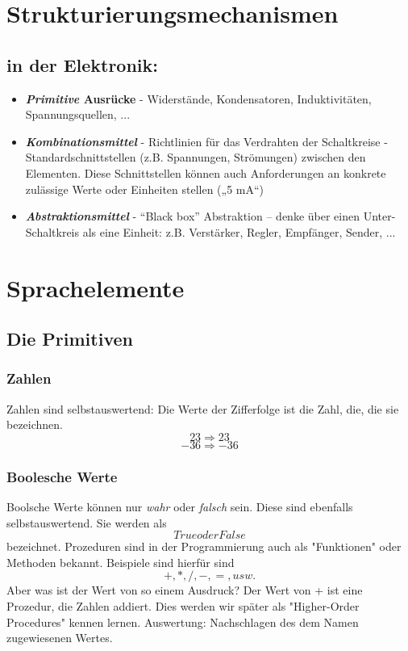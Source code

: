 \section{Strukturierungsmechanismen}
\subsection{in der Elektronik:}
\begin{itemize}
	\item \textbf{\textit{Primitive} Ausrücke}
		\subitem - Widerstände, Kondensatoren, Induktivitäten, Spannungsquellen, ...

	\item \textbf{\textit{Kombinationsmittel}}
		\subitem - Richtlinien für das Verdrahten der Schaltkreise
		\subitem - Standardschnittstellen (z.B. Spannungen, Strömungen) zwischen den
		Elementen. Diese Schnittstellen können auch Anforderungen an
		konkrete zulässige Werte oder Einheiten stellen („5 mA“)

	\item \textbf{\textit{Abstraktionsmittel}}
		\subitem - 	“Black box” Abstraktion – denke über einen Unter-Schaltkreis als eine
		Einheit: z.B. Verstärker, Regler, Empfänger, Sender, ...
\end{itemize}


\section{Sprachelemente}

\subsection{Die Primitiven}
\subsubsection{Zahlen}
Zahlen sind selbstauswertend: Die Werte der Zifferfolge ist die Zahl,
die, die sie bezeichnen.
$$ 23 \Rightarrow 23 $$
$$ -36 \Rightarrow -36 $$

\subsubsection{Boolesche Werte}
Boolsche Werte können nur \textit{wahr} oder \textit{falsch} sein. Diese sind ebenfalls
selbstauswertend. Sie werden als $$True  oder  False$$ bezeichnet. 
Prozeduren sind in der Programmierung auch als "Funktionen" oder Methoden bekannt. Beispiele sind hierfür sind
$$ +, *, /, -, =, usw.$$
Aber was ist der Wert von so einem Ausdruck? Der Wert von + ist eine Prozedur, die Zahlen addiert. Dies werden wir später als "Higher-Order Procedures" kennen lernen.
Auswertung: Nachschlagen des dem Namen zugewiesenen Wertes.

